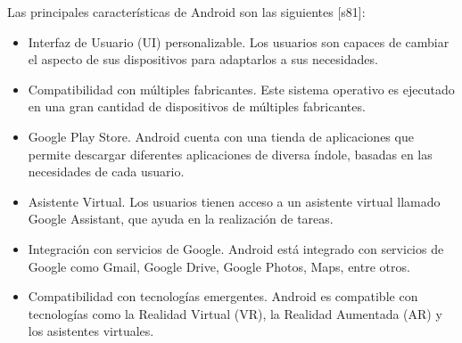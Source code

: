 Las principales características de Android son las siguientes [s81]:

\begin{itemize}

    \item Interfaz de Usuario (UI) personalizable. Los usuarios son capaces de cambiar el aspecto de sus dispositivos para adaptarlos a sus necesidades.
    \item Compatibilidad con múltiples fabricantes. Este sistema operativo es ejecutado en una gran cantidad de dispositivos de múltiples fabricantes.
    \item Google Play Store. Android cuenta con una tienda de aplicaciones que permite descargar diferentes aplicaciones de diversa índole, basadas en las necesidades de cada usuario.
    \item Asistente Virtual. Los usuarios tienen acceso a un asistente virtual llamado Google Assistant, que ayuda en la realización de tareas.
    \item Integración con servicios de Google. Android está integrado con servicios de Google como Gmail, Google Drive, Google Photos, Maps, entre otros.
    \item Compatibilidad con tecnologías emergentes. Android es compatible con tecnologías como la Realidad Virtual (VR), la Realidad Aumentada (AR) y los asistentes virtuales. 
\end{itemize}
